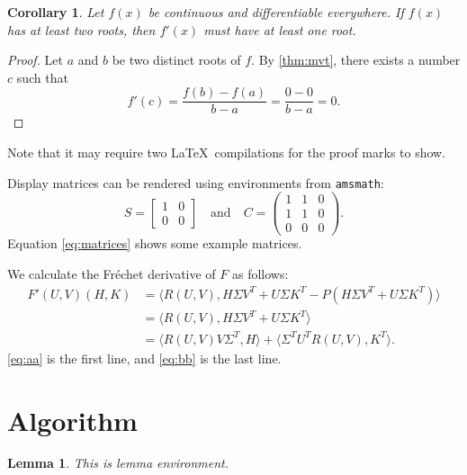 \documentclass[10pt,reqno,final]{article}
\numberwithin{equation}{section}
\numberwithin{figure}{section}
\numberwithin{table}{section}
\theoremstyle{plain}
\newtheorem{lemma}{Lemma}[section]
\newtheorem{corollary}{Corollary}[section]
\theoremstyle{definition}
\theoremstyle{remark}
\begin{document}
\begin{corollary}\label{cor:a}
  Let $f(x)$ be continuous and differentiable everywhere. If $f(x)$
  has at least two roots, then $f'(x)$ must have at least one root.
\end{corollary}
\begin{proof}
  Let $a$ and $b$ be two distinct roots of $f$.
  By \ref{thm:mvt}, there exists a number $c$ such that
  \begin{displaymath}
    f'(c) = \frac{f(b)-f(a)}{b-a} = \frac{0-0}{b-a} = 0.
  \end{displaymath}
\end{proof}

Note that it may require two \LaTeX\ compilations for the proof marks
to show.

Display matrices can be rendered using environments from \texttt{amsmath}:
\begin{equation}\label{eq:matrices}
S=\begin{bmatrix}1&0\\0&0\end{bmatrix}
\quad\text{and}\quad
C=\begin{pmatrix}1&1&0\\1&1&0\\0&0&0\end{pmatrix}.
\end{equation}
Equation \ref{eq:matrices} shows some example matrices.

We calculate the Fr\'{e}chet derivative of $F$ as follows:
\begin{subequations}
\begin{align}
  F'(U,V)(H,K)
  &= \langle R(U,V),H\Sigma V^{T} + U\Sigma K^{T} -
  P(H\Sigma V^{T} + U\Sigma K^{T})\rangle \label{eq:aa} \\
  &= \langle R(U,V),H\Sigma V^{T} + U\Sigma K^{T}\rangle
  \nonumber \\
  &= \langle R(U,V)V\Sigma^{T},H\rangle +
  \langle \Sigma^{T}U^{T}R(U,V),K^{T}\rangle. \label{eq:bb}
\end{align}
\end{subequations}
\ref{eq:aa} is the first line, and \ref{eq:bb} is the last line.

\section{Algorithm}
\label{sec:alg}

\lipsum[40]

\begin{lemma}
  This is lemma environment.
\end{lemma}
\end{document}
